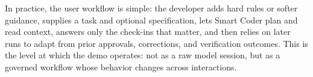 In practice, the user workflow is simple: the developer adds hard rules or softer guidance, supplies a task and optional specification, lets Smart Coder plan and read context, answers only the check-ins that matter, and then relies on later runs to adapt from prior approvals, corrections, and verification outcomes. This is the level at which the demo operates: not as a raw model session, but as a governed workflow whose behavior changes across interactions.
